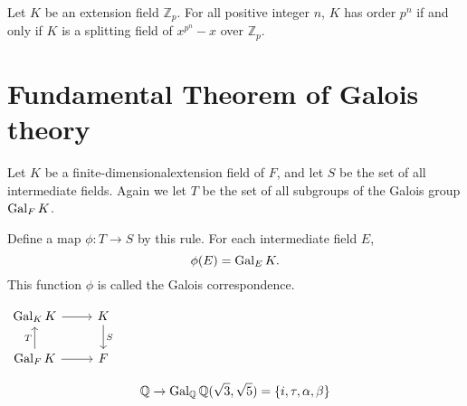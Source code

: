 \begin{theorem}
    Let $K$ be an extension field $\mathbb{Z}_p$. For all positive integer $n$, 
    $K$ has order $p^n$ if and only if $K$ is a splitting field of $x^{p^n} - x$ over $\mathbb{Z}_p$.
\end{theorem}


\section{Fundamental Theorem of Galois theory}

\begin{definition}
    Let $K$ be a finite-dimensionalextension field of $F$, and let 
    $S$ be the set of all intermediate fields. Again we let 
    $T$ be the set of all subgroups of the Galois group $\operatorname{Gal}_F K$.

    Define a map $\phi : T \to S$ by this rule. For each intermediate field $E$,
    \begin{equation}
        \phi(E) = \operatorname{Gal}_E K.
    \end{equation} 
    This function $\phi$ is called the Galois correspondence.

    \begin{center}
        $\begin{tikzcd}
            \gal_K K \arrow[r] 
            & K \arrow[d, "S"] \\
            \gal_F K \arrow[u,"T"] \arrow[r]
            & F
            \end{tikzcd}
        $
    \end{center}
\end{definition}

\begin{example}
    \[
        \mathbb{Q} \rightarrow \operatorname{Gal}_\mathbb{Q} \mathbb{Q}(\sqrt{3}, \sqrt{5}) = \{i, \tau, \alpha, \beta \}
    \]
\end{example}

